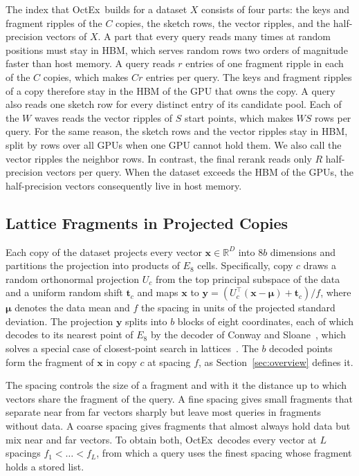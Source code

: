 \documentclass[letterpaper,twocolumn,10pt]{article}
\newcommand{\sysname}{OctEx}
\begin{document}
The index that \sysname\ builds for a dataset $X$ consists of four parts: the keys and fragment ripples of the $C$ copies, the sketch rows, the vector ripples, and the half-precision vectors of $X$. A part that every query reads many times at random positions must stay in HBM, which serves random rows two orders of magnitude faster than host memory. A query reads $r$ entries of one fragment ripple in each of the $C$ copies, which makes $C r$ entries per query. The keys and fragment ripples of a copy therefore stay in the HBM of the GPU that owns the copy. A query also reads one sketch row for every distinct entry of its candidate pool. Each of the $W$ waves reads the vector ripples of $S$ start points, which makes $W S$ rows per query. For the same reason, the sketch rows and the vector ripples stay in HBM, split by rows over all GPUs when one GPU cannot hold them. We also call the vector ripples the neighbor rows. In contrast, the final rerank reads only $R$ half-precision vectors per query. When the dataset exceeds the HBM of the GPUs, the half-precision vectors consequently live in host memory.

\subsection{Lattice Fragments in Projected Copies}
\label{sec:fragments}

Each copy of the dataset projects every vector $\mathbf{x} \in \mathbb{R}^D$ into $8b$ dimensions and partitions the projection into products of $E_8$ cells. Specifically, copy $c$ draws a random orthonormal projection $U_c$ from the top principal subspace of the data and a uniform random shift $\mathbf{t}_c$ and maps $\mathbf{x}$ to $\mathbf{y} = (U_c^\top(\mathbf{x} - \boldsymbol{\mu}) + \mathbf{t}_c)/f$, where $\boldsymbol{\mu}$ denotes the data mean and $f$ the spacing in units of the projected standard deviation. The projection $\mathbf{y}$ splits into $b$ blocks of eight coordinates, each of which decodes to its nearest point of $E_8$ by the decoder of Conway and Sloane~\cite{conway1982e8decode}, which solves a special case of closest-point search in lattices~\cite{agrell2002closest}. The $b$ decoded points form the fragment of $\mathbf{x}$ in copy $c$ at spacing $f$, as Section~\ref{sec:overview} defines it.

The spacing controls the size of a fragment and with it the distance up to which vectors share the fragment of the query. A fine spacing gives small fragments that separate near from far vectors sharply but leave most queries in fragments without data. A coarse spacing gives fragments that almost always hold data but mix near and far vectors. To obtain both, \sysname\ decodes every vector at $L$ spacings $f_1 < \dots < f_L$, from which a query uses the finest spacing whose fragment holds a stored list.
\end{document}
